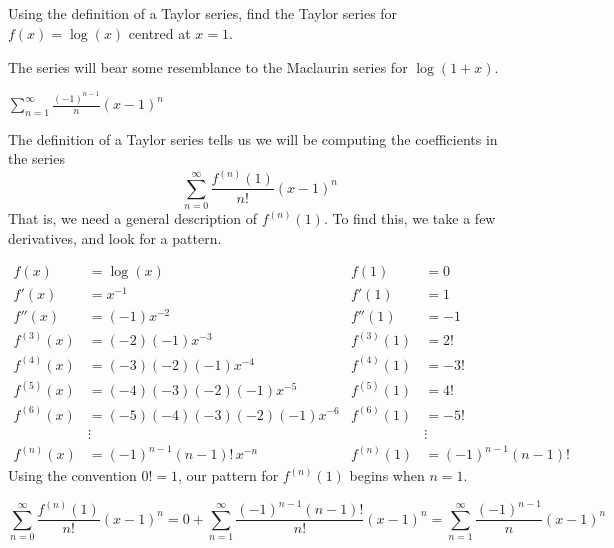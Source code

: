 
\subsection*{\Procedural}
\begin{question}\label{TSdef1}
Using the definition of a Taylor series, find the Taylor series for $f(x)=\log(x)$ centred at $x=1$.
\end{question}
\begin{hint}
The series will bear some resemblance to the Maclaurin series for $\log(1+x)$.
\end{hint}
\begin{answer}
$\displaystyle\sum_{n=1}^\infty \frac{(-1)^{n-1}}{n}(x-1)^n$
\end{answer}
\begin{solution}
The definition of a Taylor series tells us we will be computing the coefficients in the series
\[\sum_{n=0}^\infty \frac{f^{(n)}(1)}{n!}(x-1)^n\]
That is, we need a general description of $f^{(n)}(1)$. To find this, we take a few derivatives, and look for a pattern.

\begin{align*}
f(x)&=\log(x) & f(1)&=0\\
f'(x)&=x^{-1} & f'(1)&=1\\
f''(x)&=(-1)x^{-2} & f''(1)&=-1\\
f^{(3)}(x)&=(-2)(-1)x^{-3}& f^{(3)}(1)&=2!\\
f^{(4)}(x)&=(-3)(-2)(-1)x^{-4}& f^{(4)}(1)&=-3!\\
f^{(5)}(x)&=(-4)(-3)(-2)(-1)x^{-5}& f^{(5)}(1)&=4!\\
f^{(6)}(x)&=(-5)(-4)(-3)(-2)(-1)x^{-6}& f^{(6)}(1)&=-5!\\
&\vdots&&\vdots\\
f^{(n)}(x)&=(-1)^{n-1}(n-1)!\,x^{-n} & f^{(n)}(1)&=(-1)^{n-1}(n-1)!
\end{align*}
Using the convention $0!=1$, our pattern for $f^{(n)}(1)$ begins when $n=1$.

\[\sum_{n=0}^\infty \frac{f^{(n)}(1)}{n!}(x-1)^n
=0+\sum_{n=1}^\infty \frac{(-1)^{n-1}(n-1)! }{n!}(x-1)^n
=\sum_{n=1}^\infty \frac{(-1)^{n-1}}{n}(x-1)^n
\]

\end{solution}
